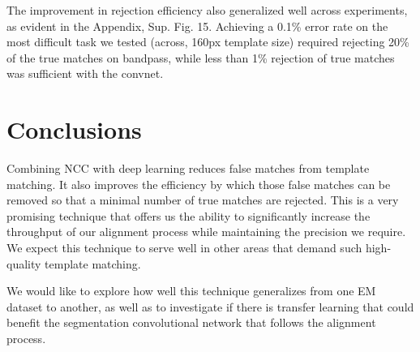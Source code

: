 \documentclass{article}
\begin{document}
The improvement in rejection efficiency also generalized well across experiments, as evident in the Appendix, Sup. Fig. 15. Achieving a 0.1\% error rate on the most difficult task we tested (across, 160px template size) required rejecting 20\% of the true matches on bandpass, while less than 1\% rejection of true matches was sufficient with the convnet.








\section{Conclusions}

Combining NCC with deep learning reduces false matches from template matching. It also improves the efficiency by which those false matches can be removed so that a minimal number of true matches are rejected. This is a very promising technique that offers us the ability to significantly increase the throughput of our alignment process while maintaining the precision we require. We expect this technique to serve well in other areas that demand such high-quality template matching.

We would like to explore how well this technique generalizes from one EM dataset to another, as well as to investigate if there is transfer learning that could benefit the segmentation convolutional network that follows the alignment process.
\end{document}
